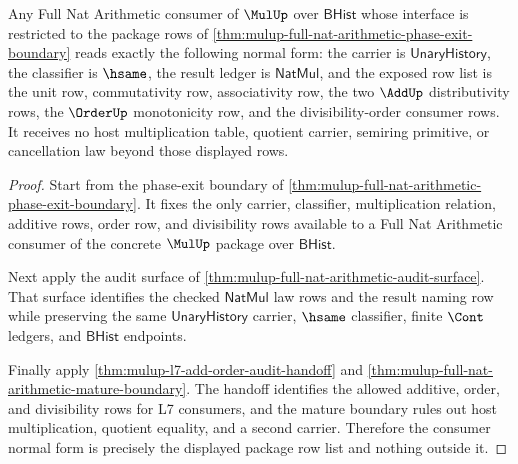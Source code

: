 \begin{theorem}
\label{thm:mulup-full-nat-arithmetic-consumer-normal-form}
Any Full Nat Arithmetic consumer of $\MulUp$ over $\mathsf{BHist}$ whose
interface is restricted to the package rows of
\autoref{thm:mulup-full-nat-arithmetic-phase-exit-boundary} reads exactly the
following normal form: the carrier is $\mathsf{UnaryHistory}$, the classifier is
$\hsame$, the result ledger is $\mathsf{NatMul}$, and the exposed row list is the
unit row, commutativity row, associativity row, the two $\AddUp$ distributivity
rows, the $\OrderUp$ monotonicity row, and the divisibility-order consumer rows.
It receives no host multiplication table, quotient carrier, semiring primitive,
or cancellation law beyond those displayed rows.
\end{theorem}
\begin{proof}
Start from the phase-exit boundary of
\autoref{thm:mulup-full-nat-arithmetic-phase-exit-boundary}. It fixes the only
carrier, classifier, multiplication relation, additive rows, order row, and
divisibility rows available to a Full Nat Arithmetic consumer of the concrete
$\MulUp$ package over $\mathsf{BHist}$.

Next apply the audit surface of
\autoref{thm:mulup-full-nat-arithmetic-audit-surface}. That surface identifies
the checked $\mathsf{NatMul}$ law rows and the result naming row while preserving
the same $\mathsf{UnaryHistory}$ carrier, $\hsame$ classifier, finite $\Cont$
ledgers, and $\mathsf{BHist}$ endpoints.

Finally apply \autoref{thm:mulup-l7-add-order-audit-handoff} and
\autoref{thm:mulup-full-nat-arithmetic-mature-boundary}. The handoff identifies
the allowed additive, order, and divisibility rows for L7 consumers, and the
mature boundary rules out host multiplication, quotient equality, and a second
carrier. Therefore the consumer normal form is precisely the displayed package
row list and nothing outside it.
\end{proof}


